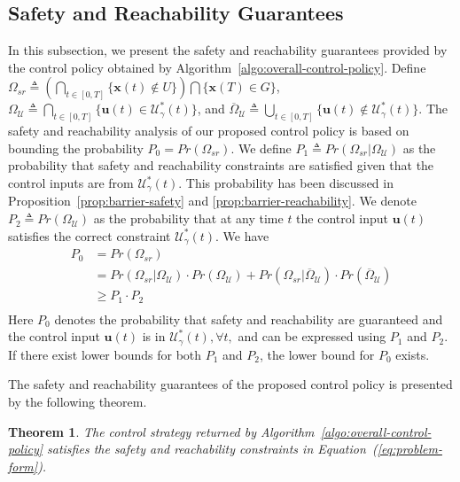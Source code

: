 \documentclass[journal]{IEEEtran}
\newtheorem{Theorem}{Theorem}
\begin{document}
\subsection{Safety and Reachability Guarantees}
In this subsection, we present the safety and reachability guarantees provided by the control policy obtained by Algorithm~\ref{algo:overall-control-policy}. Define $\Omega_{sr} \triangleq (\bigcap_{t \in [0,T]} \{\mathbf{x}(t) \notin U\}) \bigcap \{\mathbf{x}(T) \in G \}$, $\Omega_{\mathcal{U}} \triangleq \bigcap_{t \in [0,T]} \{\mathbf{u}(t) \in \mathcal{U}_{\gamma}^
{\ast}(t)\}$, and $\overline{\Omega}_{\mathcal{U}} \triangleq \bigcup_{t \in [0,T]} \{\mathbf{u}(t) \notin \mathcal{U}_{\gamma}^
{\ast}(t)\}$. The safety and reachability analysis of our proposed control policy is based on bounding the probability $P_0 = Pr\left(\Omega_{sr}\right)$. We define $P_1 \triangleq Pr(\Omega_{sr} | \Omega_{\mathcal{U}})$ as the probability that safety and reachability constraints are satisfied given that the control inputs are from $\mathcal{U}_{\gamma}^{\ast}(t)$. This probability has been discussed in Proposition~\ref{prop:barrier-safety} and \ref{prop:barrier-reachability}. We denote $P_2 \triangleq Pr(\Omega_{\mathcal{U}})$ as the probability that at any time $t$ the control input $\mathbf{u}(t)$ satisfies the correct constraint $\mathcal{U}_{\gamma}^{\ast}(t).$ We have
\begin{equation*}
\label{eqn:safety_problem}
\begin{array}{ll}
P_0 &= Pr\left(\Omega_{sr}\right) \\
&= Pr(\Omega_{sr} | \Omega_{\mathcal{U}})\cdot Pr(\Omega_{\mathcal{U}}) + Pr(\Omega_{sr} | \overline{\Omega}_{\mathcal{U}})\cdot Pr(\overline{\Omega}_{\mathcal{U}}) \\
&\geq P_1 \cdot P_2 \\
\end{array}
\end{equation*}
Here $P_0$ denotes the probability that safety and reachability are guaranteed and the control input $\mathbf{u}(t)$ is in $\mathcal{U}_{\gamma}^{\ast}(t), \forall t,$ and can be expressed using $P_1$ and $P_2$. If there exist lower bounds for both $P_1$ and $P_2$, the lower bound for $P_0$ exists. 

The safety and reachability guarantees of the proposed control policy is presented by the following theorem.

\begin{Theorem}
\label{theorem:control-policy-safety-reachability}
The control strategy returned by Algorithm~\ref{algo:overall-control-policy} satisfies the safety and reachability constraints in Equation~(\ref{eq:problem-form}). 
\end{Theorem}
\end{document}
